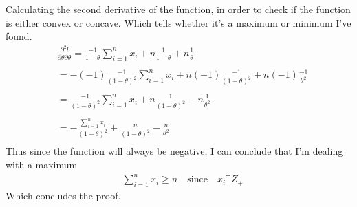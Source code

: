 Calculating the second derivative of the function, in order to check if the function is
either convex or concave. Which tells whether it's a maximum or minimum I've found.
\begin{align*}
    & \frac{\partial^2 l}{\partial \theta \partial \theta} = \frac{-1}{1 - \theta} \sum_{i = 1}^{n} x_i + n \frac{1}{1 - \theta} + n \frac{1}{\theta} \\
    & \\
    & = - (-1)\frac{-1}{(1 - \theta)^2} \sum_{i = 1}^{n} x_i + n (-1) \frac{-1}{(1 - \theta)^2} + n (-1) \frac{-1}{\theta^2} \\
    & \\
    & = \frac{-1}{(1 - \theta)^2} \sum_{i = 1}^{n} x_i + n \frac{1}{(1 - \theta)^2} - n \frac{1}{\theta^2} \\
    & \\
    & = - \frac{\sum_{i = 1}^{n} x_i}{(1 - \theta)^2} + \frac{n}{(1 - \theta)^2} - \frac{n}{\theta^2} \\
\end{align*}
Thus since the function will always be negative, I can conclude that I'm dealing with a maximum
\begin{align*}
    & \sum_{i = 1}^{n} x_i \geq n \quad \text{since} \quad x_i \exists Z_+
\end{align*}
Which concludes the proof.





